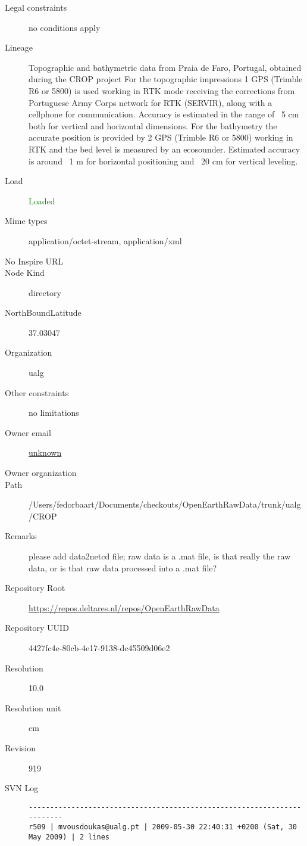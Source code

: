 \documentclass[9]{report}
\begin{document}
\begin{description}
  \item[Legal constraints] no conditions apply
  \item[Lineage] Topographic and bathymetric data from Praia de Faro, Portugal, obtained during the CROP project
For the topographic impressions 1 GPS (Trimble R6 or 5800) is used working in RTK mode receiving the corrections from Portuguese Army Corps network for RTK (SERVIR), along with a cellphone for communication. Accuracy is estimated in the range of ~5 cm both for vertical and horizontal dimensions. For the bathymetry the accurate position is provided by 2 GPS (Trimble R6 or 5800) working in RTK and the bed level is measured by an ecosounder. Estimated accuracy is around ~1 m for horizontal positioning and ~20 cm for vertical leveling.
  \item[Load] \textcolor{green}{Loaded}
  \item[Mime types] application/octet-stream, application/xml
  \item[No Inspire URL] 
  \item[Node Kind] directory
  \item[NorthBoundLatitude] 37.03047
  \item[Organization] ualg
  \item[Other constraints] no limitations
  \item[Owner email] \href{mailto:unknown}{unknown}
  \item[Owner organization] 
  \item[Path] /Users/fedorbaart/Documents/checkouts/OpenEarthRawData/trunk/ualg/CROP
  \item[Remarks] please add data2netcd file; raw data is a .mat file, is that really the raw data, or is that raw data processed into a .mat file?
  \item[Repository Root] \href{https://repos.deltares.nl/repos/OpenEarthRawData}{https://repos.deltares.nl/repos/OpenEarthRawData}
  \item[Repository UUID] 4427fc4e-80cb-4e17-9138-dc45509d06e2
  \item[Resolution] 10.0
  \item[Resolution unit] cm
  \item[Revision] 919
  \item[SVN Log] \begin{verbatim}
------------------------------------------------------------------------
r509 | mvousdoukas@ualg.pt | 2009-05-30 22:40:31 +0200 (Sat, 30 May 2009) | 2 lines




\end{verbatim}
\end{description}
\end{document}
